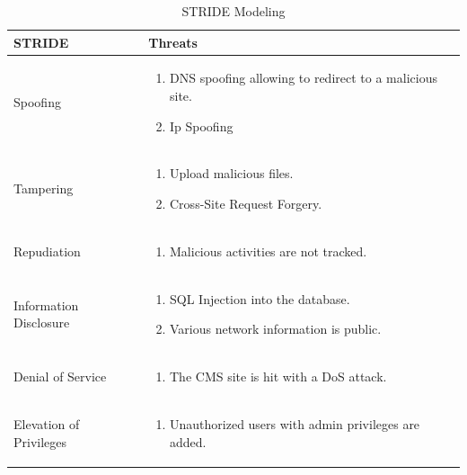 \begingroup
\centering
\setlength{\tabcolsep}{6.5pt} %
\renewcommand{\arraystretch}{1.8} %
\begin{longtable}{ |p{7cm}| p{8cm} |}
\caption{STRIDE Modeling}
    \label{table:spoofing}
\hline
\rowcolor{grey!15}
\textbf{STRIDE} & \textbf{Threats}\\
\hline
Spoofing & \begin{enumerate}
    \item DNS spoofing allowing to redirect to a malicious site.
    \item Ip Spoofing \citep[p.~2]{ip_spoofing}
\end{enumerate} \\
\hline
Tampering & \begin{enumerate}
    \item Upload malicious files.
    \item Cross-Site Request Forgery. \citep[p.~538]{crsf}
\end{enumerate} \\
\hline
Repudiation & \begin{enumerate}
    \item Malicious activities are not tracked.
\end{enumerate} \\
\hline
Information Disclosure & \begin{enumerate}
    \item SQL Injection into the database.
    \item Various network information is public.
\end{enumerate} \\
\hline
Denial of Service & \begin{enumerate}
    \item The CMS site is hit with a DoS attack.
\end{enumerate} \\
\hline
Elevation of Privileges & \begin{enumerate}
    \item Unauthorized users with admin privileges are added.
\end{enumerate} \\
\hline
\end{longtable}
\endgroup

